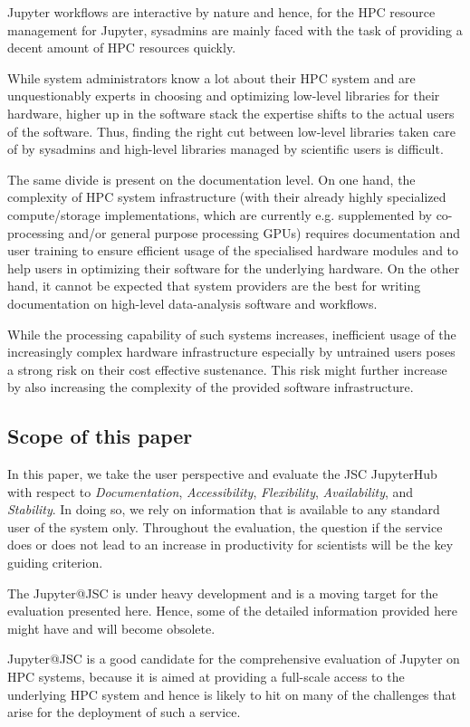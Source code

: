 Jupyter workflows are interactive by nature and hence, for the HPC resource management for Jupyter, sysadmins are mainly faced with the task of providing a decent amount of HPC resources quickly.

While system administrators know a lot about their HPC system and are unquestionably experts in choosing and optimizing low-level libraries for their hardware, higher up in the software stack the expertise shifts to the actual users of the software.
Thus, finding the right cut between low-level libraries taken care of by sysadmins and high-level libraries managed by scientific users is difficult.

The same divide is present on the documentation level.
On one hand, the complexity of HPC system infrastructure (with their already highly specialized compute/storage implementations, which are currently e.g. supplemented by co-processing and/or general purpose processing GPUs) requires documentation and user training to ensure efficient usage of the specialised hardware modules and to help users in optimizing their software for the underlying hardware.
On the other hand, it cannot be expected that system providers are the best for writing documentation on high-level data-analysis software and workflows.

While the processing capability of such systems increases, inefficient usage of the increasingly complex hardware infrastructure especially by untrained users poses a strong risk on their cost effective sustenance\cite{}.
This risk might further increase by also increasing the complexity of the provided software infrastructure.


\subsection{Scope of this paper}

In this paper, we take the user perspective and evaluate the JSC JupyterHub with respect to {\em Documentation}, {\em Accessibility}, {\em Flexibility}, {\em Availability}, and {\em Stability}.
In doing so, we rely on information that is available to any standard user of the system only.
Throughout the evaluation, the question if the service does or does not lead to an increase in productivity for scientists will be the key guiding criterion.

The Jupyter@JSC is under heavy development and is a moving target for the evaluation presented here.
Hence, some of the detailed information provided here might have and will become obsolete.

Jupyter@JSC is a good candidate for the comprehensive evaluation of Jupyter on HPC systems, because it is aimed at providing a full-scale access to the underlying HPC system and hence is likely to hit on many of the challenges that arise for the deployment of such a service. 

